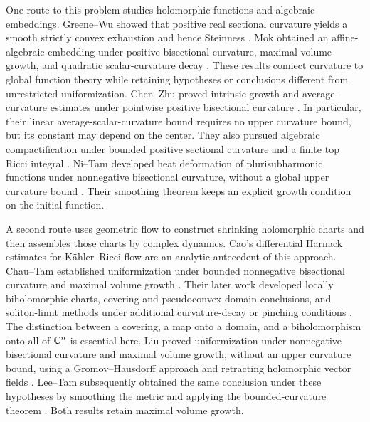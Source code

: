 One route to this problem studies holomorphic functions and
algebraic embeddings. Greene--Wu showed that positive real sectional
curvature yields a smooth strictly convex exhaustion and hence
Steinness \cite[Theorem~10]{GreeneWuConvex1976}.
Mok obtained an affine-algebraic embedding under positive bisectional
curvature, maximal volume growth, and quadratic scalar-curvature
decay \cite{MokEmbedding1984}.
These results connect curvature to global function theory while
retaining hypotheses or conclusions different from unrestricted
uniformization. Chen--Zhu proved intrinsic growth and average-curvature
estimates under pointwise positive bisectional curvature
\cite{ChenZhu}. In particular, their linear average-scalar-curvature
bound requires no upper curvature bound, but its constant may
depend on the center. They also pursued algebraic compactification
under bounded positive sectional curvature and a finite top Ricci
integral \cite{ChenZhuPositive2009}.
Ni--Tam developed heat deformation of plurisubharmonic functions
under nonnegative bisectional curvature, without a global upper
curvature bound \cite{NiTamStructure}. Their smoothing theorem
keeps an explicit growth condition on the initial function.

A second route uses geometric flow to construct shrinking holomorphic
charts and then assembles those charts by complex dynamics.
Cao's differential Harnack estimates for K\"ahler--Ricci flow
\cite{CaoHarnack} are an analytic antecedent of this approach.
Chau--Tam established uniformization under bounded nonnegative
bisectional curvature and maximal volume growth
\cite{ChauTamComplex2006}. Their later work developed locally
biholomorphic charts, covering and pseudoconvex-domain conclusions,
and soliton-limit methods under additional curvature-decay or
pinching conditions \cite{ChauTamStein,ChauTamSimply}.
The distinction between a covering, a map onto a domain, and a
biholomorphism onto all of $\mathbb C^n$ is essential here.
Liu proved uniformization under nonnegative bisectional curvature and
maximal volume growth, without an upper curvature bound, using a
Gromov--Hausdorff approach and retracting holomorphic vector fields
\cite{LiuUniformization}.  Lee--Tam subsequently obtained the same
conclusion under these hypotheses by smoothing the metric and applying
the bounded-curvature theorem \cite{LeeTam}.  Both results retain
maximal volume growth.

